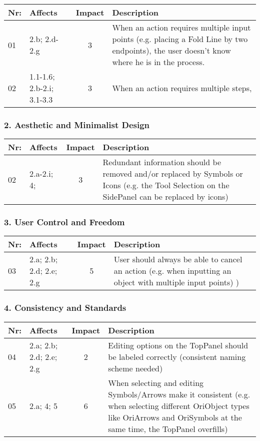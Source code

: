         \begin{tabular}{l | p{} | c | p{}}
        Nr: & Affects & Impact & Description \\ \hline
        01 & 2.b; 2.d-2.g & 3 & When an action requires multiple input points (e.g. placing a Fold Line by two endpoints), the user doesn't know where he is in the process. \\ \hline %
        02 & 1.1-1.6; 2.b-2.i; 3.1-3.3 & 3 & When an action requires multiple steps, 
        \end{tabular}



\subsubsection*{2. Aesthetic and Minimalist Design}
        \begin{tabular}{l | p{} | c | p{}}
        Nr: & Affects & Impact & Description \\ \hline
        02 & 2.a-2.i; 4;  & 3 &  Redundant information should be removed and/or replaced by Symbols or Icons (e.g. the Tool Selection on the SidePanel can be replaced by icons)\\ \hline 


        \end{tabular}

\subsubsection*{3. User Control and Freedom}

        \begin{tabular}{l | p{} | c | p{}}
        Nr: & Affects & Impact & Description \\ \hline
        03 & 2.a; 2.b; 2.d; 2.e; 2.g  & 5 & User should always be able to cancel an action (e.g. when inputting an object with multiple input points) )\\ \hline 


        \end{tabular}


\subsubsection*{4. Consistency and Standards}

        \begin{tabular}{l | p{} | c | p{}}
        Nr: & Affects & Impact & Description \\ \hline
        04 & 2.a; 2.b; 2.d; 2.e; 2.g  & 2 & Editing options on the TopPanel should be labeled correctly (consistent naming scheme needed)\\ \hline 
	05 & 2.a; 4; 5 & 6 & When selecting and editing Symbols/Arrows make it consistent (e.g. when selecting different OriObject types like OriArrows and OriSymbols at the same time, the TopPanel overfills)

        \end{tabular}

